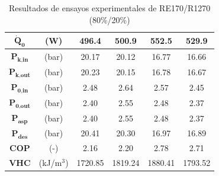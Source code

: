 \documentclass[../main.tex]{subfiles}
\begin{document}
\begin{table}[ht]
\begin{tabular}{cc|c|c|c|c|}
\hline
\multicolumn{1}{|c}{$\dot{\textbf{Q}}_\textbf{0}$} & (W) & 496.4 & 500.9 & 552.5 & 529.9 \\
\hline
\multicolumn{1}{|c}{$\textbf{P}_\textbf{k,in}$} & (bar) & 20.17 & 20.12 & 16.77 & 16.66 \\
\hline
\multicolumn{1}{|c}{$\textbf{P}_\textbf{k,out}$} & (bar) & 20.23 & 20.15 & 16.78 & 16.67 \\
\hline
\multicolumn{1}{|c}{$\textbf{P}_\textbf{0,in}$} & (bar) & 2.48 & 2.64 & 2.57 & 2.45 \\
\hline
\multicolumn{1}{|c}{$\textbf{P}_\textbf{0,out}$} & (bar) & 2.40 & 2.55 & 2.48 & 2.37 \\
\hline
\multicolumn{1}{|c}{$\textbf{P}_\textbf{asp}$} & (bar) & 2.40 & 2.55 & 2.48 & 2.37 \\
\hline
\multicolumn{1}{|c}{$\textbf{P}_\textbf{des}$} & (bar) & 20.41 & 20.30 & 16.97 & 16.89 \\
\hline
\multicolumn{1}{|c}{$\textbf{COP}$} & (-) & 2.16 & 2.20 & 2.78 & 2.71 \\
\hline
\multicolumn{1}{|c}{$\textbf{VHC}$} & (kJ/m$^3$) & 1720.85 & 1819.24 & 1880.41 & 1793.52 \\
\hline
\end{tabular}
\caption{\centering Resultados de ensayos experimentales de RE170/R1270 (80\%/20\%)}
\label{tab:RE170_R1270_80_20_anexo}
\end{table}
\end{document}
